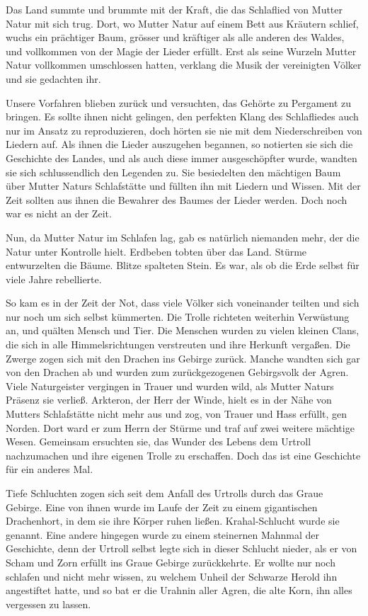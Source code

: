 Das Land summte und brummte mit der Kraft, die das Schlaflied von Mutter Natur mit sich trug. Dort, wo Mutter Natur auf einem Bett aus Kräutern schlief, wuchs ein prächtiger Baum, grösser und kräftiger als alle anderen des Waldes, und vollkommen von der Magie der Lieder erfüllt. Erst als seine Wurzeln Mutter Natur vollkommen umschlossen hatten, verklang die Musik der vereinigten Völker und sie gedachten ihr.

Unsere Vorfahren blieben zurück und versuchten, das Gehörte zu Pergament zu bringen. Es sollte ihnen nicht gelingen, den perfekten Klang des Schlafliedes auch nur im Ansatz zu reproduzieren, doch hörten sie nie mit dem Niederschreiben von Liedern auf. Als ihnen die Lieder auszugehen begannen, so notierten sie sich die Geschichte des Landes, und als auch diese immer ausgeschöpfter wurde, wandten sie sich schlussendlich den Legenden zu. Sie besiedelten den mächtigen Baum über Mutter Naturs Schlafstätte und füllten ihn mit Liedern und Wissen. Mit der Zeit sollten aus ihnen die Bewahrer des Baumes der Lieder werden. Doch noch war es nicht an der Zeit.

Nun, da Mutter Natur im Schlafen lag, gab es natürlich niemanden mehr, der die Natur unter Kontrolle hielt. Erdbeben tobten über das Land. Stürme entwurzelten die Bäume. Blitze spalteten Stein. Es war, als ob die Erde selbst für viele Jahre rebellierte.

So kam es in der Zeit der Not, dass viele Völker sich voneinander teilten und sich nur noch um sich selbst kümmerten. Die Trolle richteten weiterhin Verwüstung an, und quälten Mensch und Tier. Die Menschen wurden zu vielen kleinen Clans, die sich in alle Himmelsrichtungen verstreuten und ihre Herkunft vergaßen. Die Zwerge zogen sich mit den Drachen ins Gebirge zurück. Manche wandten sich gar von den Drachen ab und wurden zum zurückgezogenen Gebirgsvolk der Agren. Viele Naturgeister vergingen in Trauer und wurden wild, als Mutter Naturs Präsenz sie verließ. Arkteron, der Herr der Winde, hielt es in der Nähe von Mutters Schlafstätte nicht mehr aus und zog, von Trauer und Hass erfüllt, gen Norden. Dort ward er zum Herrn der Stürme und traf auf zwei weitere mächtige Wesen. Gemeinsam ersuchten sie, das Wunder des Lebens dem Urtroll nachzumachen und ihre eigenen Trolle zu erschaffen. Doch das ist eine Geschichte für ein anderes Mal.

Tiefe Schluchten zogen sich seit dem Anfall des Urtrolls durch das Graue Gebirge. Eine von ihnen wurde im Laufe der Zeit zu einem gigantischen Drachenhort, in dem sie ihre Körper ruhen ließen. Krahal-Schlucht wurde sie genannt. Eine andere hingegen wurde zu einem steinernen Mahnmal der Geschichte, denn der Urtroll selbst legte sich in dieser Schlucht nieder, als er von Scham und Zorn erfüllt ins Graue Gebirge zurückkehrte. Er wollte nur noch schlafen und nicht mehr wissen, zu welchem Unheil der Schwarze Herold ihn angestiftet hatte, und so bat er die Urahnin aller Agren, die alte Korn, ihn alles vergessen zu lassen.

